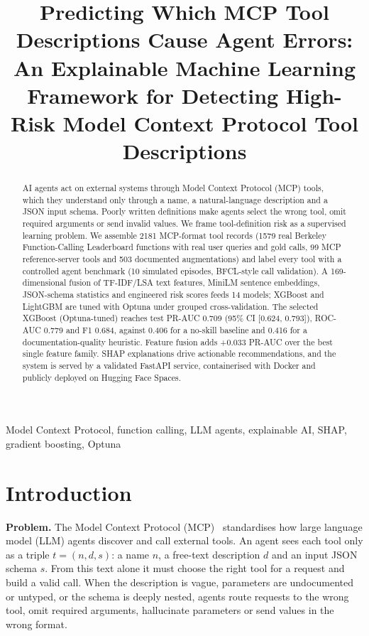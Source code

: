 \documentclass[conference]{IEEEtran}
\begin{document}
\title{Predicting Which MCP Tool Descriptions Cause Agent Errors: An Explainable Machine Learning Framework for Detecting High-Risk Model Context Protocol Tool Descriptions}
\author{
}
\maketitle

\begin{abstract}
AI agents act on external systems through Model Context Protocol (MCP) tools, which they understand only through a name, a natural-language description and a JSON input schema. Poorly written definitions make agents select the wrong tool, omit required arguments or send invalid values. We frame tool-definition risk as a supervised learning problem. We assemble 2181 MCP-format tool records (1579 real Berkeley Function-Calling Leaderboard functions with real user queries and gold calls, 99 MCP reference-server tools and 503 documented augmentations) and label every tool with a controlled agent benchmark (10 simulated episodes, BFCL-style call validation). A 169-dimensional fusion of TF-IDF/LSA text features, MiniLM sentence embeddings, JSON-schema statistics and engineered risk scores feeds 14 models; XGBoost and LightGBM are tuned with Optuna under grouped cross-validation. The selected XGBoost (Optuna-tuned) reaches test PR-AUC 0.709 (95\% CI [0.624, 0.793]), ROC-AUC 0.779 and F1 0.684, against 0.406 for a no-skill baseline and 0.416 for a documentation-quality heuristic. Feature fusion adds +0.033 PR-AUC over the best single feature family. SHAP explanations drive actionable recommendations, and the system is served by a validated FastAPI service, containerised with Docker and publicly deployed on Hugging Face Spaces.
\end{abstract}
\begin{IEEEkeywords}Model Context Protocol, function calling, LLM agents, explainable AI, SHAP, gradient boosting, Optuna\end{IEEEkeywords}

\section{Introduction}
\textbf{Problem.} The Model Context Protocol (MCP)~\cite{mcp,mcpsurvey} standardises how large language model (LLM) agents discover and call external tools. An agent sees each tool only as a triple $t=(n,d,s)$: a name $n$, a free-text description $d$ and an input JSON schema $s$. From this text alone it must choose the right tool for a request and build a valid call. When the description is vague, parameters are undocumented or untyped, or the schema is deeply nested, agents route requests to the wrong tool, omit required arguments, hallucinate parameters or send values in the wrong format.
\end{document}
